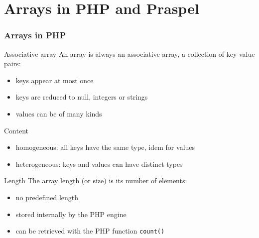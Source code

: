 \documentclass[9pt]{beamer}
\newcommand{\code}[1]{\texttt{#1}}
\newcommand{\outlinereminder}[0]{
  \frame{\frametitle{Outline}
  \tableofcontents[currentsection,subsectionstyle=show/show/hide]}
}
\begin{document}
\section[Arrays]{Arrays in PHP and Praspel}

\outlinereminder

\begin{frame}
\frametitle{Arrays in PHP}

\begin{block}{Associative array}
An array is always an associative array, a collection of key-value pairs:
\begin{itemize}
\item keys appear at most once
\item keys are reduced to null, integers or strings
\item values can be of many kinds
\end{itemize}
\end{block}

\begin{block}{Content}
\begin{itemize}
\item homogeneous: all keys have the same type, idem for values
\item heterogeneous: keys and values can have distinct types
\end{itemize}
\end{block}

\begin{block}{Length}
The array length (or size) is its number of elements:
\begin{itemize}
\item no predefined length
\item stored internally by the PHP engine
\item can be retrieved with the PHP function \code{count()}
\end{itemize}
\end{block}

\end{frame}
\end{document}

